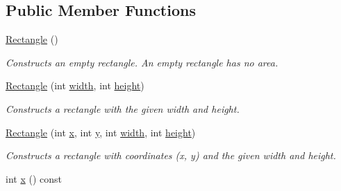 \subsection*{Public Member Functions}
\begin{DoxyCompactItemize}
\item 
\hypertarget{class_f_f_l_d_1_1_rectangle_a8a933e0ebd9e80ce91e61ffe87fd577e}{\hyperlink{class_f_f_l_d_1_1_rectangle_a8a933e0ebd9e80ce91e61ffe87fd577e}{Rectangle} ()}\label{class_f_f_l_d_1_1_rectangle_a8a933e0ebd9e80ce91e61ffe87fd577e}

\begin{DoxyCompactList}\small\item\em Constructs an empty rectangle. An empty rectangle has no area. \end{DoxyCompactList}\item 
\hypertarget{class_f_f_l_d_1_1_rectangle_a6075b7065a6cfb2e4007030d07f0d7be}{\hyperlink{class_f_f_l_d_1_1_rectangle_a6075b7065a6cfb2e4007030d07f0d7be}{Rectangle} (int \hyperlink{class_f_f_l_d_1_1_rectangle_af62553af29f32815e5055f67b96f5603}{width}, int \hyperlink{class_f_f_l_d_1_1_rectangle_a51fcde43e3b8803b7fcf3bba60167894}{height})}\label{class_f_f_l_d_1_1_rectangle_a6075b7065a6cfb2e4007030d07f0d7be}

\begin{DoxyCompactList}\small\item\em Constructs a rectangle with the given {\ttfamily width} and {\ttfamily height}. \end{DoxyCompactList}\item 
\hypertarget{class_f_f_l_d_1_1_rectangle_a6fd48c1264965fd841b2d35b7736a352}{\hyperlink{class_f_f_l_d_1_1_rectangle_a6fd48c1264965fd841b2d35b7736a352}{Rectangle} (int \hyperlink{class_f_f_l_d_1_1_rectangle_aeb9afe5d3ed04bc0158205488260b48b}{x}, int \hyperlink{class_f_f_l_d_1_1_rectangle_a2e8a52081b2efe4f08d4bcabb9ee8cc5}{y}, int \hyperlink{class_f_f_l_d_1_1_rectangle_af62553af29f32815e5055f67b96f5603}{width}, int \hyperlink{class_f_f_l_d_1_1_rectangle_a51fcde43e3b8803b7fcf3bba60167894}{height})}\label{class_f_f_l_d_1_1_rectangle_a6fd48c1264965fd841b2d35b7736a352}

\begin{DoxyCompactList}\small\item\em Constructs a rectangle with coordinates ({\ttfamily x}, {\ttfamily y}) and the given {\ttfamily width} and {\ttfamily height}. \end{DoxyCompactList}\item 
\hypertarget{class_f_f_l_d_1_1_rectangle_aeb9afe5d3ed04bc0158205488260b48b}{int \hyperlink{class_f_f_l_d_1_1_rectangle_aeb9afe5d3ed04bc0158205488260b48b}{x} () const }\label{class_f_f_l_d_1_1_rectangle_aeb9afe5d3ed04bc0158205488260b48b}


\end{DoxyCompactItemize}

